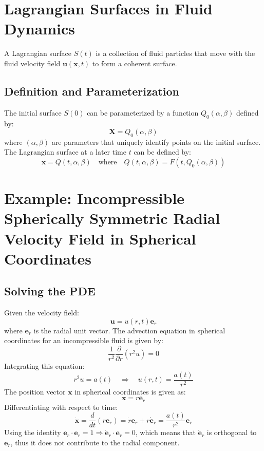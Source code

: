 \documentclass{article}
\begin{document}
\section{Lagrangian Surfaces in Fluid Dynamics}
A Lagrangian surface \( S(t) \) is a collection of fluid particles that move with the fluid velocity field \( \mathbf{u}(\mathbf{x}, t) \) to form a coherent surface.

\subsection{Definition and Parameterization}
The initial surface \( S(0) \) can be parameterized by a function \( Q_0(\alpha, \beta) \) defined by:
\begin{equation}
\mathbf{X} = Q_0(\alpha, \beta)
\end{equation}
where \( (\alpha, \beta) \) are parameters that uniquely identify points on the initial surface.
The Lagrangian surface at a later time \( t \) can be defined by:
\begin{equation}
\mathbf{x} = Q(t, \alpha, \beta) \quad \text{where} \quad Q(t, \alpha, \beta) = F(t, Q_0(\alpha, \beta))
\end{equation}

\section{Example: Incompressible Spherically Symmetric Radial Velocity Field in Spherical Coordinates}
\subsection{Solving the PDE}
Given the velocity field:
\begin{equation}
\mathbf{u} = u(r, t) \mathbf{e}_r
\end{equation}
where \(\mathbf{e}_r\) is the radial unit vector. 
The advection equation in spherical coordinates for an incompressible fluid is given by:
\begin{equation}
\frac{1}{r^2} \frac{\partial}{\partial r} (r^2 u) = 0
\end{equation}
Integrating this equation:
\begin{equation}
r^2 u = a(t) \quad \Rightarrow \quad u(r, t) = \frac{a(t)}{r^2}
\end{equation}
The position vector \(\mathbf{x}\) in spherical coordinates is given as:
\begin{equation}
\mathbf{x} = r \mathbf{e}_r
\end{equation}
Differentiating with respect to time:
\begin{equation}
\dot{\mathbf{x}} = \frac{d}{dt} (r \mathbf{e}_r) = \dot{r} \mathbf{e}_r + r \dot{\mathbf{e}}_r = \frac{a(t)}{r^2} \mathbf{e}_r
\end{equation}
Using the identity \( \mathbf{e}_r \cdot \mathbf{e}_r = 1 \Rightarrow \dot{\mathbf{e}}_r \cdot \mathbf{e}_r = 0 \), which means that \(\dot{\mathbf{e}}_r\) is orthogonal to \(\mathbf{e}_r\), thus it does not contribute to the radial component.
\end{document}
